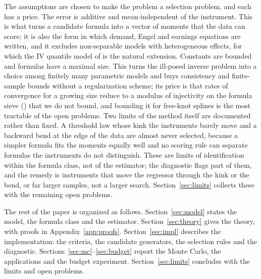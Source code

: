 The assumptions are chosen to make the problem a selection problem, and each has a price. The error is additive and mean-independent of the instrument. This is what turns a candidate formula into a vector of moments that the data can score; it is also the form in which demand, Engel and earnings equations are written, and it excludes non-separable models with heterogeneous effects, for which the IV quantile model of \citet{chernozhukovhansen2005} is the natural extension. Constants are bounded and formulas have a maximal size. This turns the ill-posed inverse problem into a choice among finitely many parametric models and buys consistency and finite-sample bounds without a regularization scheme; its price is that rates of convergence for a growing size reduce to a modulus of injectivity on the formula sieve () that we do not bound, and bounding it for free-knot splines is the most tractable of the open problems. Two limits of the method itself are documented rather than fixed. A threshold law whose kink the instruments barely move and a backward bend at the edge of the data are almost never selected, because a simpler formula fits the moments equally well and no scoring rule can separate formulas the instruments do not distinguish. These are limits of identification within the formula class, not of the estimator; the diagnostic flags part of them, and the remedy is instruments that move the regressor through the kink or the bend, or far larger samples, not a larger search. Section~\ref{sec:limits} collects these with the remaining open problems.

The rest of the paper is organized as follows. Section~\ref{sec:model} states the model, the formula class and the estimator. Section~\ref{sec:theory} gives the theory, with proofs in Appendix~\ref{app:proofs}. Section~\ref{sec:impl} describes the implementation: the criteria, the candidate generators, the selection rules and the diagnostic. Sections~\ref{sec:mc}--\ref{sec:budget} report the Monte Carlo, the applications and the budget experiment. Section~\ref{sec:limits} concludes with the limits and open problems.
